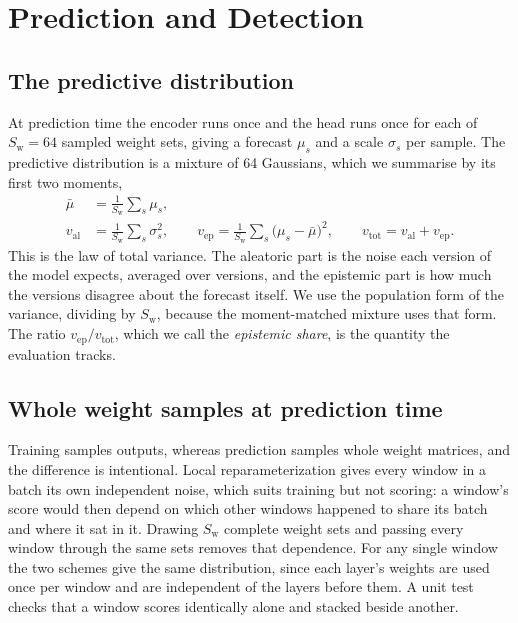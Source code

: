 \documentclass{article}
\begin{document}
\section{Prediction and Detection}
\label{sec:detection}

\subsection{The predictive distribution}
\label{sec:predictive}

At prediction time the encoder runs once and the head runs once for each of
$S_{\mathrm{w}} = 64$ sampled weight sets, giving a forecast $\mu_{s}$ and a
scale $\sigma_{s}$ per sample. The predictive distribution is a mixture of 64
Gaussians, which we summarise by its first two moments,
\begin{align}
  \bar{\mu} &= \frac{1}{S_{\mathrm{w}}} \sum_{s} \mu_{s}, \\
  v_{\mathrm{al}} &= \frac{1}{S_{\mathrm{w}}} \sum_{s} \sigma_{s}^{2}, \qquad
  v_{\mathrm{ep}} = \frac{1}{S_{\mathrm{w}}} \sum_{s} \big(\mu_{s} - \bar{\mu}\big)^{2}, \qquad
  v_{\mathrm{tot}} = v_{\mathrm{al}} + v_{\mathrm{ep}} .
\end{align}
This is the law of total variance. The aleatoric part is the noise each version
of the model expects, averaged over versions, and the epistemic part is how
much the versions disagree about the forecast itself. We use the population
form of the variance, dividing by $S_{\mathrm{w}}$, because the moment-matched
mixture uses that form. The ratio $v_{\mathrm{ep}} / v_{\mathrm{tot}}$, which
we call the \emph{epistemic share}, is the quantity the evaluation tracks.

\subsection{Whole weight samples at prediction time}
\label{sec:weightspace}

Training samples outputs, whereas prediction samples whole weight matrices, and
the difference is intentional. Local reparameterization gives every window in
a batch its own independent noise, which suits training but not scoring: a
window's score would then depend on which other windows happened to share its
batch and where it sat in it. Drawing $S_{\mathrm{w}}$ complete weight sets and
passing every window through the same sets removes that dependence. For any
single window the two schemes give the same distribution, since each layer's
weights are used once per window and are independent of the layers before
them. A unit test checks that a window scores identically alone and stacked
beside another.
\end{document}
